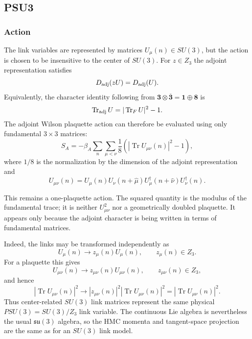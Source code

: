 \subsection{\label{sec:psu3}PSU3}

\subsubsection{Action}

The link variables are represented by matrices $U_\mu(n)\in SU(3)$, but the
action is chosen to be insensitive to the center of $SU(3)$.  For
$z\in Z_3$ the adjoint representation satisfies
\begin{equation}
D_{\rm adj}(zU)=D_{\rm adj}(U).
\end{equation}
Equivalently, the character identity following from
$\mathbf{3}\otimes\overline{\mathbf{3}}=\mathbf{1}\oplus\mathbf{8}$ is
\begin{equation}
\operatorname{Tr}_{\rm adj} U
=|\operatorname{Tr}_{F}U|^2-1 .
\end{equation}
The adjoint Wilson plaquette action can therefore be evaluated using only
fundamental $3\times3$ matrices:
\begin{equation}
S_A=-\beta_A\sum_n\sum_{\mu<\nu}\frac{1}{8}
\left(|\operatorname{Tr}U_{\mu\nu}(n)|^2-1\right),
\end{equation}
where $1/8$ is the normalization by the dimension of the adjoint
representation and
\begin{equation}
U_{\mu\nu}(n)=U_\mu(n)U_\nu(n+\hat\mu)
U_\mu^\dagger(n+\hat\nu)U_\nu^\dagger(n).
\end{equation}

This remains a one-plaquette action.  The squared quantity is the modulus of
the fundamental trace; it is neither $U_{\mu\nu}^2$ nor a geometrically
doubled plaquette.  It appears only because the adjoint character is being
written in terms of fundamental matrices.

Indeed, the links may be transformed independently as
\begin{equation}
U_\mu(n)\longrightarrow z_\mu(n)U_\mu(n),
\qquad z_\mu(n)\in Z_3.
\end{equation}
For a plaquette this gives
\begin{equation}
U_{\mu\nu}(n)\longrightarrow z_{\mu\nu}(n)U_{\mu\nu}(n),
\qquad z_{\mu\nu}(n)\in Z_3,
\end{equation}
and hence
\begin{equation}
|\operatorname{Tr}U_{\mu\nu}(n)|^2
\longrightarrow
|z_{\mu\nu}(n)|^2|\operatorname{Tr}U_{\mu\nu}(n)|^2
=|\operatorname{Tr}U_{\mu\nu}(n)|^2.
\end{equation}
Thus center-related $SU(3)$ link matrices represent the same physical
$PSU(3)=SU(3)/Z_3$ link variable.  The continuous Lie algebra is nevertheless
the usual $\mathfrak{su}(3)$ algebra, so the HMC momenta and tangent-space
projection are the same as for an $SU(3)$ link model.

